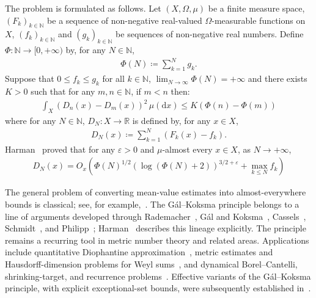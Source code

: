 \documentclass[12pt,reqno]{amsart}
\theoremstyle{definition}
\theoremstyle{plain}
\begin{document}
The problem is formulated as follows. Let $(X,\Omega,\mu)$ be a finite measure space, $(F_k)_{k\in\mathbb{N}}$ be a sequence of non-negative real-valued $\Omega$-measurable functions on $X$, $(f_k)_{k\in\mathbb{N}}$ and $(g_k)_{k\in\mathbb{N}}$ be sequences of non-negative real numbers. Define $\Phi:\mathbb{N}\to[0,+\infty)$ by, for any $N\in\mathbb{N}$, 
\begin{align}
\label{eq:def_Phi}
    \Phi(N)\coloneqq\sum_{k=1}^N g_k.
\end{align}
Suppose that $0\leq f_k\leq g_k$ for all $k\in\mathbb{N}$, $\lim_{N\to\infty}\Phi(N)=+\infty$ and there exists $K>0$ such that for any $m,n\in\mathbb{N}$, if $m<n$ then:
\begin{align*}
    \int_X\left(D_n(x)-D_m(x)\right)^2
    \,\mu(\mathrm dx)
    \leq
    K\left(\Phi(n)-\Phi(m)\right)
\end{align*}
where for any $N\in\mathbb{N}$, $D_N:X\to\mathbb{R}$ is defined by, for any $x\in X$,
\begin{align}
\label{eq:def_D_N}
    D_N(x)\coloneqq\sum_{k=1}^N\left(F_k(x)-f_k\right).
\end{align}
Harman~\cite[Lemma~1.5]{Harman1998} proved that for any $\varepsilon>0$ and $\mu$-almost every $x\in X$, as $N\to+\infty$,
\begin{align*}
    D_N(x)
    =
    O_x\!\left(
        \Phi(N)^{1/2}
        \left(\log(\Phi(N)+2)\right)^{3/2+\varepsilon}
        +
        \max_{k\leq N}f_k
    \right)
\end{align*}

The general problem of converting mean-value estimates into almost-everywhere bounds is classical; see, for example,~\cite{Harman1998,Sprindzuk1979}. The G\'al--Koksma principle belongs to a line of arguments developed through Rademacher~\cite{Rademacher1922}, G\'al and Koksma~\cite{GalKoksma1950}, Cassels~\cite{Cassels1950III}, Schmidt~\cite{Schmidt1964}, and Philipp~\cite{Philipp1967}; Harman~\cite{Harman1998} describes this lineage explicitly. The principle remains a recurring tool in metric number theory and related areas. Applications include quantitative Diophantine approximation~\cite{Harman1998,PollingtonVelaniZafeiropoulosZorin2022}, metric estimates and Hausdorff-dimension problems for Weyl sums~\cite{BakerChenShparlinski2022}, and dynamical Borel--Cantelli, shrinking-target, and recurrence problems~\cite{HaydnNicolVaientiZhang2013,LevesleyLiSimmonsVelani2025}. Effective variants of the G\'al–Koksma principle, with explicit exceptional-set bounds, were subsequently established in~\cite{LeeScoones2025}.
\end{document}
